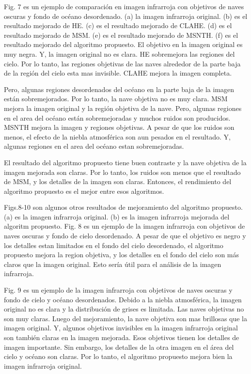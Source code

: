 \documentclass[a4paper, 11 pt, conference]{ieeeconf}      %
\begin{document}
Fig. 7 es un ejemplo de comparaci\'on en imagen infrarroja con objetivos de naves oscuras y fondo de oc\'eano desordenado. (a) la imagen infrarroja original. (b) es el resultado mejorado de HE. (c) es el resultado mejorado de CLAHE. (d) es el resultado mejorado de MSM. (e) es el resultado mejorado de MSNTH. (f) es el resultado mejorado del algoritmo propuesto. El objetivo en la imagen original es muy negra. Y, la imagen original no es clara. HE sobremejora las regiones del cielo. Por lo tanto, las regiones objetivas de las naves alrededor de la parte baja de la regi\'on del cielo esta mas invisible. CLAHE mejora la imagen completa. 

Pero, algunas regiones desordenados del oc\'eano en la parte baja de la imagen est\'an sobremejorados. Por lo tanto, la nave objetiva no es muy clara. MSM mejora la imagen original y la regi\'on objetiva de la nave. Pero, algunas regiones en el area del oc\'eano est\'an sobremejoradas y muchos ruidos son producidos. MSNTH mejora la imagen y regiones objetivas. A pesar de que los ruidos son menos, el efecto de la niebla atmosf\'erica son aun pesados en el resultado. Y, algunas regiones en el area del oc\'eano estan sobremejoradas.

El resultado del algoritmo propuesto tiene buen contraste y la nave objetiva de la imagen mejorada son claras. Por lo tanto, los ruidos son menos que el resultado de MSM, y los detalles de la imagen son claras. Entonces, el rendimiento del algoritmo propuesto es el mejor entre esos algoritmos.

Figs.8-10 son algunos otros resultados de mejoramiento del algoritmo propuesto. (a) es la imagen infrarroja original. (b) es la imagen infrarroja mejorada del algoritm propuesto. Fig. 8 es un ejemplo de la imagen infrarroja con objetivos de naves oscuras y fondo de cielo desordenado. A pesar de que el objetivo es negro y los detalles estan limitados en el fondo del cielo desordenado, el algoritmo propuesto mejora la region objetiva, y los detalles en el fondo del cielo son m\'as claros que la imagen original. Esto ser\'ia \'util para el an\'alisis de la imagen infrarroja.

Fig. 9 es un ejemplo de la imagen infrarroja con objetivos de naves oscuras y fondo de cielo y oc\'eano desordenados. Debido   a la niebla atmosf\'erica, la imagen original no es clara y la distribuci\'on de grises es limitada. Las naves objetivas no son muy claras. Luego del mejoramiento, la nave objetiva son mas brillosas que la imagen original. Y, algunos objetivos invisibles en la imagen infrarroja original son tambi\'en claras en la imagen mejorada. Esos objetivos tienen los detalles de imagen importante. Sin embargo, los detalles de la otra imagen en el \'area del cielo y oc\'eano son claras. Por lo tanto, el algoritmo propuesto mejora bien la imagen infrarroja original.
\end{document}
